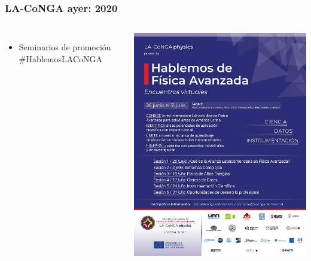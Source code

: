 \begin{frame}[fragile]
\frametitle{LA-CoNGA ayer: 2020}
\begin{columns}[c] %
\begin{itemize}
	\item Seminarios de promoción \#HablemosLACoNGA
	\end{itemize}
\begin{center}
\includegraphics[scale=0.4]{imagenes/afiche-LACoNGA-peque.jpg}
\end{center}

\end{columns}
\end{frame}

